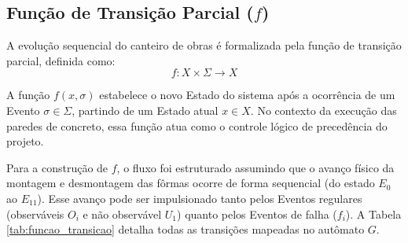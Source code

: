 \subsection{Função de Transição Parcial ($f$)}

A evolução sequencial do canteiro de obras é formalizada pela função de transição parcial, definida como:
\begin{equation}
	f : X \times \Sigma \rightarrow X
	\label{eq:funcao_transicao}
\end{equation}

A função $f(x, \sigma)$ estabelece o novo Estado do sistema após a ocorrência de um Evento $\sigma \in \Sigma$, partindo de um Estado atual $x \in X$. No contexto da execução das paredes de concreto, essa função atua como o controle lógico de precedência do projeto. 

Para a construção de $f$, o fluxo foi estruturado assumindo que o avanço físico da montagem e desmontagem das fôrmas ocorre de forma sequencial (do estado $E_0$ ao $E_{11}$). Esse avanço pode ser impulsionado tanto pelos Eventos regulares (observáveis $O_i$ e não observável $U_1$) quanto pelos Eventos de falha ($f_i$). A Tabela \ref{tab:funcao_transicao} detalha todas as transições mapeadas no autômato $G$.

